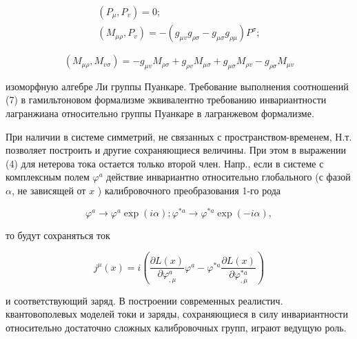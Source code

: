 \documentclass[10pt]{article}
\begin{document}
\[

\begin{gathered}

\left(P_{\mu}, P_{v}\right)=0 ; \\

\left(M_{\mu \rho}, P_{v}\right)=-\left(g_{\mu v} g_{\rho \sigma}-g_{\mu \sigma} g_{\rho \mu}\right) P^{\sigma} ;

\end{gathered}

\]



\[

\left(M_{\mu \rho}, M_{v \sigma}\right)=-g_{\mu v} M_{\rho \sigma}+g_{\rho v} M_{\mu \sigma}+g_{\mu \sigma} M_{\rho v}-g_{\rho \sigma} M_{\mu v}

\]



изоморфную алгебре Ли группы Пуанкаре. Требование выполнения соотношений (7) в гамильтоновом формализме эквивалентно требованию инвариантности лагранжиана относительно группы Пуанкаре в лагранжевом формализме.



При наличии в системе симметрий, не связанных с пространством-временем, Н.т. позволяет построить и другие сохраняющиеся величины. При этом в выражении (4) для нетерова тока остается только второй член. Напр., если в системе с комплексным полем $\varphi^{a}$ действие инвариантно относительно глобального (с фазой $\alpha$, не зависящей от $x$ ) калибровочного преобразования 1-го рода



\[

\varphi^{a} \rightarrow \varphi^{a} \exp (i \alpha) ; \varphi^{* a} \rightarrow \varphi^{* a} \exp (-i \alpha),

\]



то будут сохраняться ток



\[

j^{\mu}(x)=i\left(\frac{\partial L(x)}{\partial \varphi_{, \mu}^{a}} \varphi^{a}-\varphi^{* a} \frac{\partial L(x)}{\partial \varphi_{, \mu}^{* a}}\right)

\]



и соответствующий заряд. В построении современных реалистич. квантовополевых моделей токи и заряды, сохраняющиеся в силу инвариантности относительно достаточно сложных калибровочных групп, играют ведущую роль.
\end{document}
